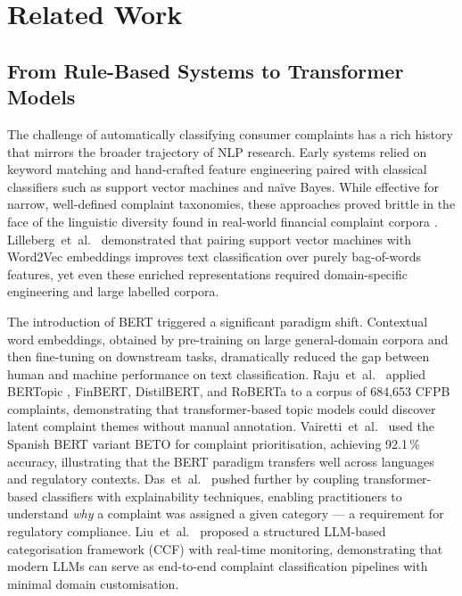 \documentclass[a4paper,fleqn]{cas-dc}
\begin{document}
\section{Related Work}
\label{sec:related}

\subsection{From Rule-Based Systems to Transformer Models}

The challenge of automatically classifying consumer complaints has a
rich history that mirrors the broader trajectory of NLP research. Early
systems relied on keyword matching and hand-crafted feature engineering
paired with classical classifiers such as support vector machines and
na{\"i}ve Bayes. While effective for narrow, well-defined complaint
taxonomies, these approaches proved brittle in the face of the
linguistic diversity found in real-world financial complaint corpora
\cite{raju2022bertopic,jondhale2024cfpb}.
Lilleberg~et~al.\ \cite{lilleberg2015word2vec} demonstrated that pairing
support vector machines with Word2Vec embeddings improves text classification
over purely bag-of-words features, yet even these enriched representations
required domain-specific engineering and large labelled corpora.

The introduction of BERT \cite{devlin2019bert} triggered a significant
paradigm shift. Contextual word embeddings, obtained by pre-training on
large general-domain corpora and then fine-tuning on downstream tasks,
dramatically reduced the gap between human and machine performance on
text classification. Raju~et~al.\ \cite{raju2022bertopic} applied
BERTopic \cite{grootendorst2020bertopic}, FinBERT, DistilBERT, and
RoBERTa to a corpus of 684,653 CFPB complaints, demonstrating that
transformer-based topic models could discover latent complaint themes
without manual annotation. Vairetti~et~al.\ \cite{vairetti2024bert}
used the Spanish BERT variant BETO for complaint prioritisation,
achieving 92.1\,\% accuracy, illustrating that the BERT paradigm
transfers well across languages and regulatory contexts. Das~et~al.\
\cite{das2024explainable} pushed further by coupling transformer-based
classifiers with explainability techniques, enabling practitioners to
understand \emph{why} a complaint was assigned a given category --- a
requirement for regulatory compliance. Liu~et~al.\ \cite{liu2024framework}
proposed a structured LLM-based categorisation framework (CCF) with
real-time monitoring, demonstrating that modern LLMs can serve as
end-to-end complaint classification pipelines with minimal domain
customisation.
\end{document}
